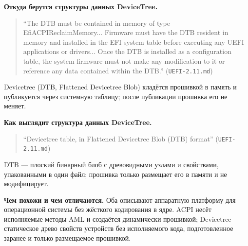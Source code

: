 \documentclass[a4paper,12pt]{article}
\begin{document}
\textbf{Откуда берутся структуры данных DeviceTree.} 
\begin{quote}
``The DTB must be contained in memory of type EfiACPIReclaimMemory... Firmware must have the DTB resident in memory and installed in the EFI system table before executing any UEFI applications or drivers... Once the DTB is installed as a configuration table, the system firmware must not make any modification to it or reference any data contained within the DTB.'' (\texttt{UEFI-2.11.md})
\end{quote}
Devicetree (DTB, Flattened Devicetree Blob) кладётся прошивкой в память и публикуется через системную таблицу; после публикации прошивка его не меняет.

\textbf{Как выглядит структура данных DeviceTree.}
\begin{quote}
``Devicetree table, in Flattened Devicetree Blob (DTB) format'' (\texttt{UEFI-2.11.md})
\end{quote}
DTB — плоский бинарный блоб с древовидными узлами и свойствами, упакованными в один файл; прошивка только размещает его в памяти и не модифицирует.

\textbf{Чем похожи и чем отличаются.} Оба описывают аппаратную платформу для операционной системы без жёсткого кодирования в ядре. ACPI несёт исполняемые методы AML и создаётся динамически прошивкой; Devicetree — статическое древо свойств устройств без исполняемого кода, подготовленное заранее и только размещаемое прошивкой.
\end{document}
